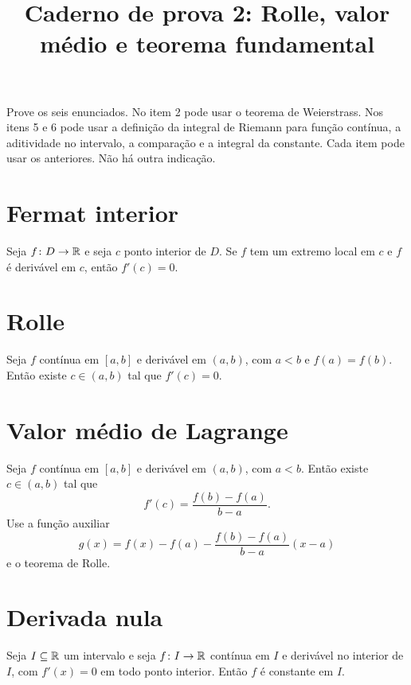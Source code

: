 \documentclass[11pt,a4paper]{article}
\title{Caderno de prova 2: Rolle, valor médio e teorema fundamental}
\author{}
\date{}
\begin{document}
\maketitle
\tableofcontents

Prove os seis enunciados. No item 2 pode usar o teorema de Weierstrass. Nos itens 5 e 6 pode usar a definição da integral de Riemann para função contínua, a aditividade no intervalo, a comparação e a integral da constante. Cada item pode usar os anteriores. Não há outra indicação.

\section{Fermat interior}

Seja $f\colon D\to\mathbb{R}$ e seja $c$ ponto interior de $D$. Se $f$ tem um extremo local em $c$ e $f$ é derivável em $c$, então $f'(c)=0$.

\vspace{6.5cm}

\section{Rolle}

Seja $f$ contínua em $[a,b]$ e derivável em $(a,b)$, com $a<b$ e $f(a)=f(b)$. Então existe $c\in(a,b)$ tal que $f'(c)=0$.

\vspace{6.5cm}

\section{Valor médio de Lagrange}

Seja $f$ contínua em $[a,b]$ e derivável em $(a,b)$, com $a<b$. Então existe $c\in(a,b)$ tal que
\[
f'(c)=\frac{f(b)-f(a)}{b-a}.
\]
Use a função auxiliar
\[
g(x)=f(x)-f(a)-\frac{f(b)-f(a)}{b-a}(x-a)
\]
e o teorema de Rolle.

\vspace{6.5cm}

\section{Derivada nula}

Seja $I\subseteq\mathbb{R}$ um intervalo e seja $f\colon I\to\mathbb{R}$ contínua em $I$ e derivável no interior de $I$, com $f'(x)=0$ em todo ponto interior. Então $f$ é constante em $I$.

\vspace{6.5cm}
\end{document}
